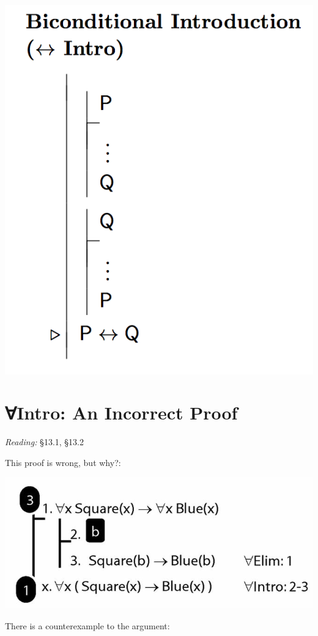 \documentclass[12pt]{extarticle}
\begin{document}
\begin{multicols*}{3}
\begin{center}
\includegraphics[scale=0.3]{img/rule_biconditional_intro.png}
\end{center}
 
 
\section{∀Intro: An Incorrect Proof}
 
\emph{Reading:} §13.1, §13.2
 
This proof is wrong, but why?:
 
\begin{center}
\includegraphics[scale=0.3]{img/unit_572_proof.png}
\end{center}
There is a counterexample to the argument:
 

\end{multicols*}
\end{document}
